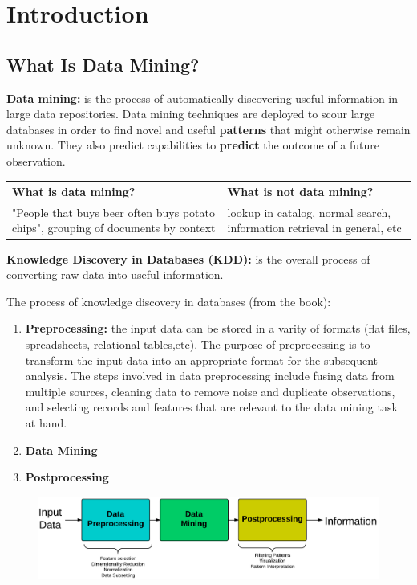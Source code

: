 \chapter{Introduction}
\clearpage

\section{What Is Data Mining?}
	
	{\bf Data mining:} is the process of automatically discovering useful information
	in large data repositories. Data mining techniques are deployed to scour large 
	databases in order to find novel and useful {\bf patterns} that might otherwise remain 
	unknown. They also predict capabilities to {\bf predict} the outcome of a future 
	observation.

	\begin{table}[H]
	\begin{tabular}{| p{6cm} | p{6cm} |}
		\hline
		{\bf What is data mining?} & {\bf What is not data mining?} \\ \hline
		"People that buys beer often buys potato chips", 
		grouping of documents by context & 
		lookup in catalog, normal search, information retrieval in general, etc \\ \hline
	\end{tabular}
	\end{table}	

	{\bf Knowledge Discovery in Databases (KDD): } is the overall process of converting raw 
	data into useful information. 

	The process of knowledge discovery in databases (from the book):
	\begin{enumerate}
		\item {\bf Preprocessing:} the input data can be stored in a varity of formats (flat files, spreadsheets, relational tables,etc). The purpose of preprocessing is to transform the input data into an appropriate format for the subsequent analysis. The steps involved in data preprocessing include fusing data from multiple sources, cleaning data to remove noise and duplicate observations, and selecting records and features that are relevant to the data mining task at hand. 
		\item {\bf Data Mining}
		\item {\bf Postprocessing}
	\end{enumerate}

		\begin{figure}[H]
			\includegraphics[width=\textwidth]{pics/KDD.png}
		\end{figure}

